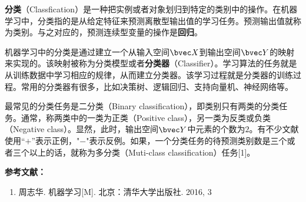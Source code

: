

\textbf{分类}（Classfication）是一种把实例或者对象划归到特定的类别中的操作。在机器学习中，分类指的是从给定特征来预测离散型输出值的学习任务。预测输出值就称为类别。与之对应的，预测连续型变量的操作是\textbf{回归}。

机器学习中的分类是通过建立一个从输入空间$\bvec X$到输出空间$\bvec Y$的映射来实现的。该映射被称为分类模型或者\textbf{分类器}（Classifier）。学习算法的任务就是从训练数据中学习相应的规律，从而建立分类器。该学习过程就是分类器的训练过程。常用的分类器有很多，比如决策树、逻辑回归、支持向量机、神经网络等。

最常见的分类任务是二分类（Binary classification），即类别只有两类的分类任务。通常，称两类中的一类为正类（Positive class），另一类为反类或负类（Negative class）。显然，此时，输出空间$\bvec Y$中元素的个数为$2$。有不少文献使用“$+$”表示正例，"$-$"表示反例。如果，一个分类任务的待预测类别数是三个或者三个以上的话，就称为多分类（Muti-class classification）任务[1]。




\textbf{参考文献：}
\begin{enumerate}
\item 周志华. 机器学习[M]. 北京：清华大学出版社. 2016, 3
\end{enumerate}